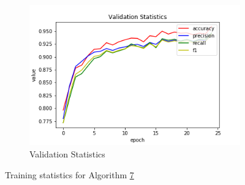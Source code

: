 \begin{figure}[h!]
\begin{subfigure}[b]{0.35\linewidth}
    \includegraphics[width=\linewidth]{images/cae_online_lstm/caelstm_section_lstm_training_block_map_10000_model_validation_stats.png}
     \caption{Validation Statistics}
  \end{subfigure}
  \caption{Training statistics for Algorithm \hyperref[tab: app_evalalgorithms]{7}}
  \label{fig: train_olnine_lstm_7}
\end{figure}

\pagebreak

